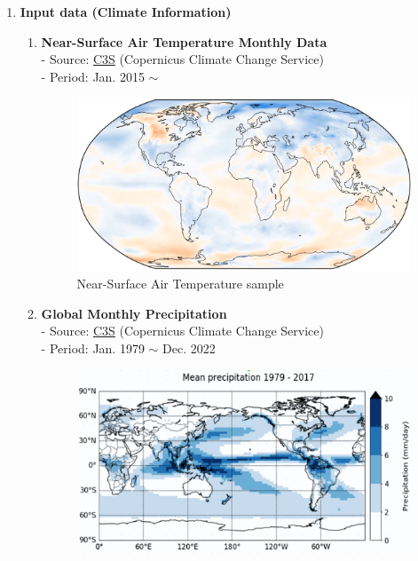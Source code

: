 \documentclass[11pt, oneside]{article}   	%
\begin{document}
\begin{enumerate}
\item \textbf{Input data (Climate Information)}
	\begin{enumerate}[label=(\alph*)]
	\item \textbf{Near-Surface Air Temperature Monthly Data} \\
	- Source: \href{https://cds.climate.copernicus.eu/}{C3S} (Copernicus Climate Change Service) \\
	- Period: Jan. 2015 $\sim$ \\
	\begin{figure}[htbp]
    		\centering
	    \begin{minipage}{0.6\textwidth}
    		\includegraphics[width=\textwidth]{images/image_for_proposal_1.png}
	    \end{minipage}%

    		\begin{minipage}[t]{0.6\textwidth}
	    \caption{Near-Surface Air Temperature sample}
    		\label{fig1}
   	 	\end{minipage}%
	\end{figure}
	\item \textbf{Global Monthly Precipitation} \\
	- Source: \href{https://cds.climate.copernicus.eu/}{C3S} (Copernicus Climate Change Service) \\
	- Period: Jan. 1979 $\sim$ Dec. 2022 \\
	\begin{figure}[htbp]
    		\centering
	    \begin{minipage}{0.6\textwidth}
    		\includegraphics[width=\textwidth]{images/image_for_proposal_2.png}
	    \end{minipage}%


\end{figure}
\end{enumerate}
\end{enumerate}
\end{document}
